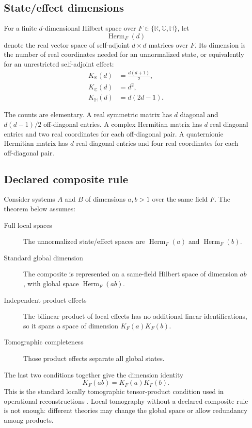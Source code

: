 \documentclass[11pt]{article}
\newcommand{\R}{\mathbb{R}}
\newcommand{\C}{\mathbb{C}}
\newcommand{\HH}{\mathbb{H}}
\newcommand{\Herm}{\operatorname{Herm}}
\begin{document}
\subsection{State/effect dimensions}

For a finite \(d\)-dimensional Hilbert space over
\(F\in\{\R,\C,\HH\}\), let
\[
\Herm_F(d)
\]
denote the real vector space of self-adjoint \(d\times d\) matrices over \(F\). Its dimension is the number of real coordinates needed for an unnormalized state, or equivalently for an unrestricted self-adjoint effect:
\begin{align}
K_{\R}(d)&=\frac{d(d+1)}{2},\label{eq:KR}\\
K_{\C}(d)&=d^2,\label{eq:KC}\\
K_{\HH}(d)&=d(2d-1).\label{eq:KH}
\end{align}

The counts are elementary. A real symmetric matrix has \(d\) diagonal and
\(d(d-1)/2\) off-diagonal entries. A complex Hermitian matrix has \(d\) real diagonal entries and two real coordinates for each off-diagonal pair. A quaternionic Hermitian matrix has \(d\) real diagonal entries and four real coordinates for each off-diagonal pair.

\subsection{Declared composite rule}

Consider systems \(A\) and \(B\) of dimensions \(a,b>1\) over the same field \(F\). The theorem below assumes:
\begin{description}
\item[Full local spaces] The unnormalized state/effect spaces are
\(\Herm_F(a)\) and \(\Herm_F(b)\).
\item[Standard global dimension] The composite is represented on a
same-field Hilbert space of dimension \(ab\), with global space
\(\Herm_F(ab)\).
\item[Independent product effects] The bilinear product of local effects has
no additional linear identifications, so it spans a space of dimension
\(K_F(a)K_F(b)\).
\item[Tomographic completeness] Those product effects separate all global
states.
\end{description}

The last two conditions together give the dimension identity
\begin{equation}
K_F(ab)=K_F(a)K_F(b).
\label{eq:local-tomography}
\end{equation}
This is the standard locally tomographic tensor-product condition used in operational reconstructions
\cite{HardyWootters2012,BarnumWilce2014}. Local tomography without a declared composite rule is not enough: different theories may change the global space or allow redundancy among products.
\end{document}
